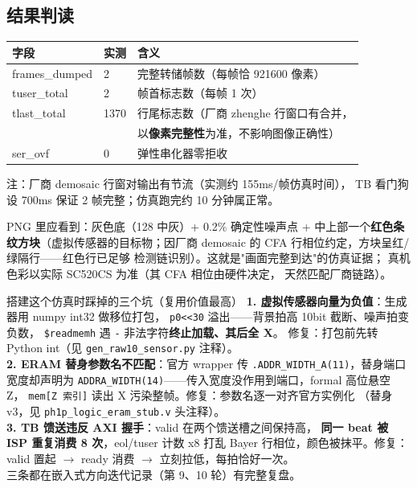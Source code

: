 \documentclass[11pt]{ctexart}
\newcommand{\code}[1]{\texttt{#1}}
\begin{document}
\subsection{结果判读}

\begin{center}
\begin{tabular}{lll}
\toprule
\rowcolor{rowtint}\textbf{字段} & \textbf{实测} & \textbf{含义} \\
\midrule
frames\_dumped & 2 & 完整转储帧数（每帧恰 921600 像素） \\
tuser\_total & 2 & 帧首标志数（每帧 1 次） \\
tlast\_total & 1370 & 行尾标志数（厂商 zhenghe 行窗口有合并， \\
& & 以\textbf{像素完整性}为准，不影响图像正确性） \\
ser\_ovf & 0 & 弹性串化器零拒收 \\
\bottomrule
\end{tabular}
\end{center}

注：厂商 demosaic 行窗对输出有节流（实测约 155ms/帧仿真时间），
TB 看门狗设 700ms 保证 2 帧完整；仿真跑完约 10 分钟属正常。

PNG 里应看到：灰色底（128 中灰）+ 0.2\% 确定性噪声点 +
中上部一个\textbf{红色条纹方块}（虚拟传感器的目标物；因厂商
demosaic 的 CFA 行相位约定，方块呈红/绿隔行——红色行已足够
检测链识别）。这就是"画面完整到达"的仿真证据；
真机色彩以实际 SC520CS 为准（其 CFA 相位由硬件决定，
天然匹配厂商链路）。

\begin{warnbox}{搭建这个仿真时踩掉的三个坑（复用价值最高）}
\textbf{1. 虚拟传感器向量为负值}：生成器用 numpy int32 做移位打包，
\code{p0<<30} 溢出——背景拍高 10bit 截断、噪声拍变负数，
\code{\$readmemh} 遇 \code{-} 非法字符\textbf{终止加载、其后全 X}。
修复：打包前先转 Python int（见 \code{gen\_raw10\_sensor.py} 注释）。\\
\textbf{2. ERAM 替身参数名不匹配}：官方 wrapper 传
\code{.ADDR\_WIDTH\_A(11)}，替身端口宽度却声明为
\code{ADDRA\_WIDTH(14)}——传入宽度没作用到端口，formal 高位悬空 Z，
\code{mem[Z 索引]} 读出 X 污染整帧。修复：参数名逐一对齐官方实例化
（替身 v3，见 \code{ph1p\_logic\_eram\_stub.v} 头注释）。\\
\textbf{3. TB 馈送违反 AXI 握手}：valid 在两个馈送槽之间保持高，
\textbf{同一 beat 被 ISP 重复消费 8 次}，eol/tuser 计数 x8 打乱
Bayer 行相位，颜色被抹平。修复：valid 置起 $\rightarrow$ ready 消费
$\rightarrow$ 立刻拉低，每拍恰好一次。\\[3pt]
三条都在嵌入式方向迭代记录（第 9、10 轮）有完整复盘。
\end{warnbox}
\end{document}
